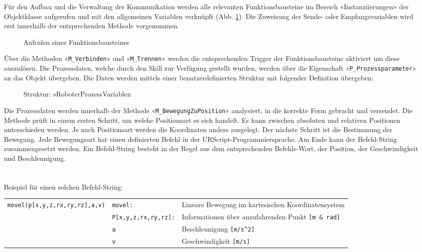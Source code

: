 		\newpage
		
		Für den Aufbau und die Verwaltung der Kommunikation werden alle relevanten Funktionsbausteine im Bereich «Instanziierungen» der Objektklasse aufgerufen und mit den allgemeinen Variablen verknüpft (Abb. \ref{fig:FB_Roboter_SendStart}). Die Zuweisung der Sende- oder Empfangsvariablen wird erst innerhalb der entsprechenden Methode vorgenommen. 
		
		\begin{figure}[h!]
			\centering
			\captionsetup{justification=centering}
			\caption{Aufrufen eines Funktionsbausteines}
			\label{fig:FB_Roboter_SendStart}
		\end{figure}
		
		Über die Methoden «\verb|M_Verbinden|» und «\verb|M_Trennen|» werden die entsprechenden Trigger der Funktionsbausteine aktiviert um diese auszulösen.  
		Die Prozessdaten, welche durch den Skill zur Verfügung gestellt wurden, werden über die Eigenschaft «\verb|P_Prozessparameter|» an das Objekt übergeben. Die Daten werden mittels einer benutzerdefinierten Struktur mit folgender Definition übergeben:
		
		\begin{figure}[h!]
			\centering
			\captionsetup{justification=centering}
			\caption{Struktur: sRoboterProzessVariablen}
			\label{fig:sRoboterProzessVariablen}
		\end{figure}
		
		Die Prozessdaten werden innerhalb der Methode «\verb|M_BewegungZuPosition|» analysiert, in die korrekte Form gebracht und versendet.  Die Methode prüft in einem ersten Schritt, um welche Positionsart es sich handelt. Es kann zwischen absoluten und relativen Positionen unterschieden werden. Je nach Positionsart werden die Koordinaten anders ausgelegt. Der nächste Schritt ist die Bestimmung der Bewegung. Jede Bewegungsart hat einen definierten Befehl in der URScript-Programmiersprache. Am Ende kann der Befehl-String zusammengesetzt werden. Ein Befehl-String besteht in der Regel aus dem entsprechenden Befehls-Wort, der Position, der Geschwindigkeit und Beschleunigung. 
		\\
		\\
		\\
		Beispiel für einen solchen Befehl-String: 
		
		\begin{tabularx}{\textwidth}{@{}>{}p{12em} @{}>{}p{10em} X@{}}
			\scriptsize 
			\verb|movel(p[x,y,z,rx,ry,rz],a,v)| 	& \verb|movel:|	& Lineare Bewegung im kartesischen Koordinatensystem 
			\\
										& \verb|P[x,y,z,rx,ry,rz]:| & Informationen über anzufahrenden Punkt \verb|[m & rad]|
			\\
													& \verb|a|		& Beschleunigung \verb|[m/s^2]|
			\\
													& \verb|v|		& Geschwindigkeit \verb|[m/s]|
			\\
		\end{tabularx}
		
